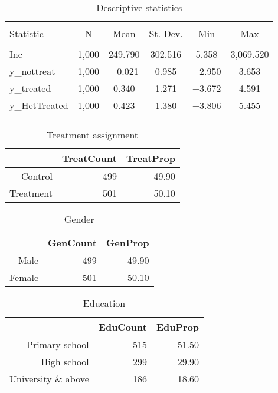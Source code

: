\documentclass[11pt, a4paper]{article}\usepackage[]{graphicx}\usepackage[]{color}
\begin{document}
\begin{table}[!htbp] \centering 
  \caption{Descriptive statistics} 
  \label{} 
\begin{tabular}{@{\extracolsep{5pt}}lccccc} 
\\[-1.8ex]\hline 
\hline \\[-1.8ex] 
Statistic & \multicolumn{1}{c}{N} & \multicolumn{1}{c}{Mean} & \multicolumn{1}{c}{St. Dev.} & \multicolumn{1}{c}{Min} & \multicolumn{1}{c}{Max} \\ 
\hline \\[-1.8ex] 
Inc & 1,000 & 249.790 & 302.516 & 5.358 & 3,069.520 \\ 
y\_nottreat & 1,000 & $-$0.021 & 0.985 & $-$2.950 & 3.653 \\ 
y\_treated & 1,000 & 0.340 & 1.271 & $-$3.672 & 4.591 \\ 
y\_HetTreated & 1,000 & 0.423 & 1.380 & $-$3.806 & 5.455 \\ 
\hline \\[-1.8ex] 
\end{tabular} 
\end{table} 
\begin{table}[ht]
\centering
\caption{Treatment assignment} 
\begin{tabular}{rrr}
  \hline
 & TreatCount & TreatProp \\ 
  \hline
Control & 499 & 49.90 \\ 
  Treatment & 501 & 50.10 \\ 
   \hline
\end{tabular}
\end{table}
\begin{table}[ht]
\centering
\caption{Gender} 
\begin{tabular}{rrr}
  \hline
 & GenCount & GenProp \\ 
  \hline
Male & 499 & 49.90 \\ 
  Female & 501 & 50.10 \\ 
   \hline
\end{tabular}
\end{table}
\begin{table}[ht]
\centering
\caption{Education} 
\begin{tabular}{rrr}
  \hline
 & EduCount & EduProp \\ 
  \hline
Primary school & 515 & 51.50 \\ 
  High school & 299 & 29.90 \\ 
  University \& above & 186 & 18.60 \\ 
   \hline
\end{tabular}
\end{table}
\end{document}
